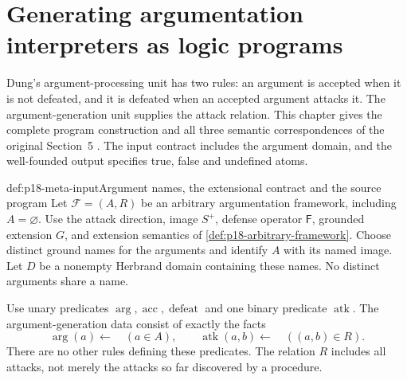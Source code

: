 \chapter{Generating argumentation interpreters as logic programs}
\label{sec:p18-argumentation-meta-interpreters}

Dung's argument-processing unit has two rules: an argument is accepted
when it is not defeated, and it is defeated when an accepted argument
attacks it. The argument-generation unit supplies the attack relation.
This chapter gives the complete program construction and all three
semantic correspondences of the original Section~5
\cite[pp.~348--350, theorem~62]{Dung1995}. The input contract includes
the argument domain, and the well-founded output specifies true,
false and undefined atoms.

\begin{hbdefinition}{def:p18-meta-input}{Argument names, the extensional contract and the source program}
Let \(\mathcal F=(A,R)\) be an arbitrary argumentation framework,
including \(A=\varnothing\). Use the attack direction, image \(S^+\),
defense operator \(\mathsf F\), grounded extension \(G\), and extension
semantics of \cref{def:p18-arbitrary-framework}.
Choose distinct ground names for the arguments and identify \(A\)
with its named image. Let \(D\) be a nonempty Herbrand domain
containing these names. No distinct arguments share a name.

Use unary predicates \(\operatorname{arg},\operatorname{acc},
\operatorname{defeat}\) and one binary predicate
\(\operatorname{atk}\). The argument-generation data consist
of exactly the facts
\[
 \operatorname{arg}(a)\leftarrow\quad(a\in A),\qquad
 \operatorname{atk}(a,b)\leftarrow\quad((a,b)\in R).
\]
There are no other rules defining these predicates.
The relation \(R\) includes all attacks, not merely the attacks
so far discovered by a procedure.


\end{hbdefinition}
